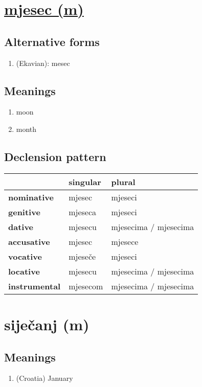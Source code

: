 \filbreak
\section{\underline{mjesec (m)}}
\subsection*{Alternative forms}
\begin{enumerate}
\item (Ekavian): mesec
\end{enumerate}
\subsection*{Meanings}
\begin{enumerate}
\item moon
\item month
\end{enumerate}
\subsection*{Declension pattern}
\begin{tabularx}{\linewidth}{Xll}
\toprule
{} &  singular &                 plural \\
\midrule
\textbf{nominative  } &    mjesec &                mjeseci \\
\textbf{genitive    } &   mjeseca &                mjeseci \\
\textbf{dative      } &   mjesecu &  mjesecima / mjesecima \\
\textbf{accusative  } &    mjesec &                mjesece \\
\textbf{vocative    } &   mjeseče &                mjeseci \\
\textbf{locative    } &   mjesecu &  mjesecima / mjesecima \\
\textbf{instrumental} &  mjesecom &  mjesecima / mjesecima \\
\bottomrule
\end{tabularx}

\filbreak
\section{siječanj (m)}
\subsection*{Meanings}
\begin{enumerate}
\item (Croatia) January
\end{enumerate}
